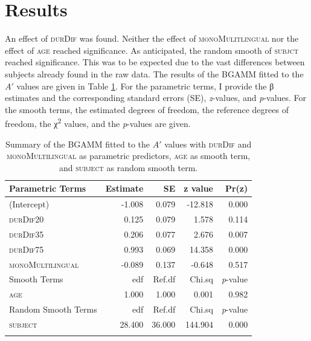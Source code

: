 \section{Results}\label{section06_3}

An effect of \textsc{durDif} was found. Neither the effect of \textsc{monoMulitlingual} nor the effect of \textsc{age} reached significance. As anticipated, the random smooth of \textsc{subjct} reached significance. This was to be expected due to the vast differences between subjects already found in the raw data. The results of the BGAMM fitted to the $A'$ values are given in Table \ref{tab:6.11}. For the parametric terms, I provide the β estimates and the corresponding standard errors (SE), \textit{z}-values, and \textit{p}-values. For the smooth terms, the estimated degrees of freedom, the reference degrees of freedom, the χ\textsuperscript{2} values, and the \textit{p}-values are given.

\begin{table}\fontsize{10}{11}
\caption{Summary of the BGAMM fitted to the $A'$ values with \textsc{durDif} and \textsc{monoMultilingual} as parametric predictors, \textsc{age} as smooth term, and \textsc{subject} as random smooth term.}
\label{tab:6.11}
\centering
\begin{tabular}{lrrrr} 
\lsptoprule
Parametric Terms    & Estimate & SE     & z value & Pr(\textbar{}z\textbar{})  \\ 
\midrule
(Intercept)         & -1.008   & 0.079  & -12.818 & 0.000                      \\
\textsc{durDif20}            & 0.125    & 0.079  & 1.578   & 0.114                      \\
\textsc{durDif35}            & 0.206    & 0.077  & 2.676   & 0.007                      \\
\textsc{durDif75}            & 0.993    & 0.069  & 14.358  & 0.000                      \\
\textsc{monoMultilingual}    & -0.089   & 0.137  & -0.648  & 0.517                      \\ 
\midrule
Smooth Terms        & edf      & Ref.df & Chi.sq  & \textit{p}-value           \\ 
\midrule
\textsc{age}                 & 1.000    & 1.000  & 0.001   & 0.982                      \\ 
\midrule
Random Smooth Terms & edf      & Ref.df & Chi.sq  & \textit{p}-value           \\ 
\midrule
\textsc{subject}             & 28.400   & 36.000 & 144.904 & 0.000                      \\
\lspbottomrule
\end{tabular}
\end{table}

